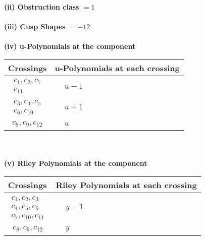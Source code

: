 \documentclass[1p]{elsarticle_modified}
\theoremstyle{definition}
\begin{document}
\flushleft \textbf{(ii) Obstruction class $= 1$}\\~\\
\flushleft \textbf{(iii) Cusp Shapes $= -12$}\\~\\
\newpage\renewcommand{\arraystretch}{1}
\flushleft \textbf{(iv) u-Polynomials at the component}\newline \\
\begin{tabular}{m{50pt}|m{274pt}}
Crossings & \hspace{64pt}u-Polynomials at each crossing \\
\hline $$\begin{aligned}c_{1},c_{2},c_{7}\\c_{11}\end{aligned}$$&$\begin{aligned}
&u-1
\end{aligned}$\\
\hline $$\begin{aligned}c_{3},c_{4},c_{5}\\c_{6},c_{10}\end{aligned}$$&$\begin{aligned}
&u+1
\end{aligned}$\\
\hline $$\begin{aligned}c_{8},c_{9},c_{12}\end{aligned}$$&$\begin{aligned}
&u
\end{aligned}$\\
\hline
\end{tabular}\\~\\
\newpage\renewcommand{\arraystretch}{1}
\flushleft \textbf{(v) Riley Polynomials at the component}\newline \\
\begin{tabular}{m{50pt}|m{274pt}}
Crossings & \hspace{64pt}Riley Polynomials at each crossing \\
\hline $$\begin{aligned}c_{1},c_{2},c_{3}\\c_{4},c_{5},c_{6}\\c_{7},c_{10},c_{11}\end{aligned}$$&$\begin{aligned}
&y-1
\end{aligned}$\\
\hline $$\begin{aligned}c_{8},c_{9},c_{12}\end{aligned}$$&$\begin{aligned}
&y
\end{aligned}$\\
\hline
\end{tabular}\\~\\
\end{document}
